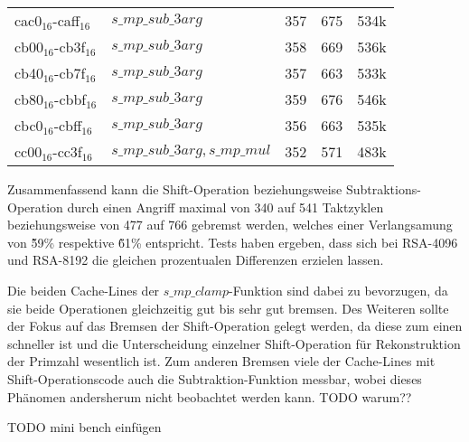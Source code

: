 \begin{table}[h]
\begin{tabular}{lllll}
cac0$_{16}$-caff$_{16}$  & $s\_mp\_sub\_3arg$             & 357   & 675         & 534k    \\
cb00$_{16}$-cb3f$_{16}$  & $s\_mp\_sub\_3arg$            & 358   & 669         & 536k    \\
cb40$_{16}$-cb7f$_{16}$  & $s\_mp\_sub\_3arg$             & 357   & 663         & 533k    \\
cb80$_{16}$-cbbf$_{16}$  & $s\_mp\_sub\_3arg$             & 359   & 676         & 546k    \\
cbc0$_{16}$-cbff$_{16}$  & $s\_mp\_sub\_3arg$             & 356   & 663         & 535k    \\
cc00$_{16}$-cc3f$_{16}$  & $s\_mp\_sub\_3arg, s\_mp\_mul$ & 352   & 571         & 483k   
\end{tabular}
\end{table}


Zusammenfassend kann die Shift-Operation beziehungsweise Subtraktions-Operation durch einen Angriff maximal von 340 auf 541 Taktzyklen beziehungsweise von 477 auf 766 gebremst werden, welches einer Verlangsamung von \~59\% respektive \~61\% entspricht.
Tests haben ergeben, dass sich bei RSA-4096 und RSA-8192 die gleichen prozentualen Differenzen erzielen lassen.

Die beiden Cache-Lines der $s\_mp\_clamp$-Funktion sind dabei zu bevorzugen, da sie beide Operationen gleichzeitig gut bis sehr gut bremsen.
Des Weiteren sollte der Fokus auf das Bremsen der Shift-Operation gelegt werden, da diese zum einen schneller ist und die Unterscheidung einzelner Shift-Operation für Rekonstruktion der Primzahl wesentlich ist.
Zum anderen Bremsen viele der Cache-Lines mit Shift-Operationscode auch die Subtraktion-Funktion messbar, wobei dieses Phänomen andersherum nicht beobachtet werden kann.
TODO warum??

TODO mini bench einfügen




